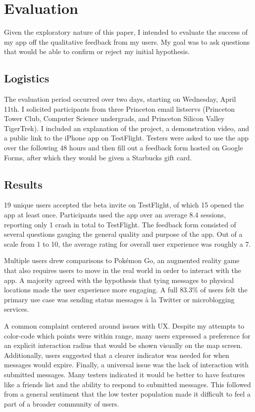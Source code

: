 \section{Evaluation}

Given the exploratory nature of this paper, I intended to evaluate the success of my app off the qualitative feedback from my users. My goal was to ask questions that would be able to confirm or reject my initial hypothesis.

\subsection{Logistics}

The evaluation period occurred over two days, starting on Wednesday, April 11th. I solicited participants from three Princeton email listservs (Princeton Tower Club, Computer Science undergrads, and Princeton Silicon Valley TigerTrek). I included an explanation of the project, a demonstration video, and a public link to the iPhone app on TestFlight. Testers were asked to use the app over the following 48 hours and then fill out a feedback form hosted on Google Forms, after which they would be given a Starbucks gift card.

\subsection{Results}

19 unique users accepted the beta invite on TestFlight, of which 15 opened the app at least once. Participants used the app over an average 8.4 sessions, reporting only 1 crash in total to TestFlight. The feedback form consisted of several questions gauging the general quality and purpose of the app. Out of a scale from 1 to 10, the average rating for overall user experience was roughly a 7.

Multiple users drew comparisons to Pokémon Go, an augmented reality game that also requires users to move in the real world in order to interact with the app. A majority agreed with the hypothesis that tying messages to physical locations made the user experience more engaging. A full 83.3\% of users felt the primary use case was sending status messages à la Twitter or microblogging services.

A common complaint centered around issues with \textsc{UX}. Despite my attempts to color-code which points were within range, many users expressed a preference for an explicit interaction radius that would be shown visually on the map screen. Additionally, users suggested that a clearer indicator was needed for when messages would expire. Finally, a universal issue was the lack of interaction with submitted messages. Many testers indicated it would be better to have features like a friends list and the ability to respond to submitted messages. This followed from a general sentiment that the low tester population made it difficult to feel a part of a broader community of users.

